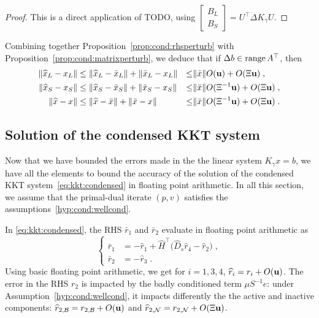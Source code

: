 \begin{proof}
  This is a direct application of TODO, using $\begin{bmatrix} B_L \\ B_S
  \end{bmatrix} = U^\top \Delta K_\gamma U$.
\end{proof}

Combining together Proposition~\ref{prop:cond:rhsperturb}
with Proposition~\ref{prop:cond:matrixperturb}, we deduce that
if $\Delta b \in \operatorname{range}{A^\top}$, then
\begin{equation}
  \label{eq:cond:boundbacksolve}
  \begin{aligned}
    \| \widehat{x}_L - x_L  \| & \leq \|\widehat{x}_L - \bar{x}_L \|  + \|\bar{x}_L - x_L \|
    & \leq& \| \bar{x} \| O(\mathbf{u}) + O(\Xi\mathbf{u}) \;, \\
    \| \widehat{x}_S - x_S  \| & \leq \|\widehat{x}_S - \bar{x}_S \|  + \|\bar{x}_S - x_S \|
        & \leq& \| \bar{x} \| O(\Xi^{-1}\mathbf{u}) + O(\Xi\mathbf{u}) \;, \\
    \| \widehat{x} - x  \| & \leq \|\widehat{x} - \bar{x} \|  + \|\bar{x}- x \|
        & \leq& \| \bar{x} \| O(\Xi^{-1}\mathbf{u}) + O(\Xi \mathbf{u}) \;.
  \end{aligned}
\end{equation}


\subsection{Solution of the condensed KKT system}
Now that we have bounded the errors made in the the linear system
$K_\gamma x = b$, we have all the elements to bound the accuracy
of the solution of the condensed KKT system~\eqref{eq:kkt:condensed}
in floating point arithmetic. In all this section, we assume that
the primal-dual iterate $(p,v)$ satisfies the assumptions~\ref{hyp:cond:wellcond}.

In \eqref{eq:kkt:condensed}, the RHS $\bar{r}_1$ and $\bar{r}_2$
evaluate in floating point arithmetic as
\begin{equation}
  \label{eq:cond:condensedrhs}
  \left\{
  \begin{aligned}
    \bar{r}_1 &= - \widehat{r}_1 + \widehat{H}^\top\big(\widehat{D}_{s} \widehat{r}_{4} - \widehat{r}_{2} \big) \;, \\
     \bar{r}_2 &= -\widehat{r}_3 \; .
  \end{aligned}
  \right.
\end{equation}
Using basic floating point arithmetic, we get for $i=1,3,4$, $\widehat{r}_i = r_i + O(\mathbf{u})$.
The error in the RHS $r_2$ is impacted by the badly conditioned term $\mu S^{-1}e$:
under Assumption~\ref{hyp:cond:wellcond}, it impacts differently
the the active and inactive components:
$\widehat{r}_{2,\mathcal{B}}= r_{2,\mathcal{B}} + O(\mathbf{u})$ and
$\widehat{r}_{2,\mathcal{N}}= r_{2,\mathcal{N}} + O(\Xi \mathbf{u})$.

